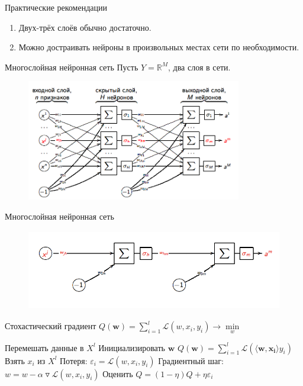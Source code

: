 \documentclass[10pt]{beamer}
\begin{document}
\begin{frame}{Практические рекомендации}
	\begin{enumerate}[--]
    	\item Двух-трёх слоёв обычно достаточно.
	  \item Можно достраивать нейроны в произвольных местах сети по необходимости.
	\end{enumerate}
\end{frame}

\begin{frame}{Многослойная нейронная сеть}
	Пусть $Y = \mathbb{R}^M$, два слоя в сети.\\
	
	\begin{figure}[htbp]
	  \includegraphics[height=150pt, keepaspectratio = true]{images/neural_network}   
	\end{figure}
\end{frame}

\begin{frame}{Многослойная нейронная сеть}
	\begin{figure}[htbp]
	  \includegraphics[height=100pt, keepaspectratio = true]{images/neural_network1}   
	\end{figure}
\end{frame}

\begin{frame}{Стохастический градиент}
  ${Q}(\mathbf{w}) = \sum\limits_{i=1}^l \mathcal{L}(w, x_i, y_i) \rightarrow \min\limits_w$ \\
  \bigbreak
  \begin{algorithmic}[1]
     \State Перемешать данные в $X^l$
     \State Инициализировать $\mathbf{w}$
     \State ${Q}(\mathbf{w}) = \sum\limits_{i=1}^l \mathcal{L}(\langle \mathbf{w}, \mathbf{x_i} \rangle y_i)$
       \State Взять $x_i$ из $X^l$
       \State Потеря: $\varepsilon_i = \mathcal{L}(w, x_i, y_i)$
       \State Градиентный шаг: $w =  w - \alpha \triangledown \mathcal{L}(w, x_i, y_i)$
       \State Оценить $Q = (1-\eta)Q + \eta \varepsilon_i$
     \EndRepeat
    \EndFunction
  \end{algorithmic}  
\end{frame}
\end{document}
